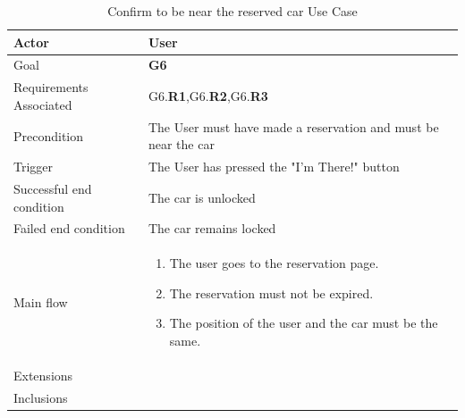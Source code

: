 \newline
\begin{table}[htb]
\begin{center}
\renewcommand{\arraystretch}{1.5}
\begin{tabular}{|l|p{}|}
\hline
Actor & User \\ \hline
Goal & \textbf{G6} \\ \hline
Requirements Associated & G6.\textbf{R1},G6.\textbf{R2},G6.\textbf{R3} \\ \hline
Precondition & The User must have made a reservation and must be near the car \\ \hline
Trigger & The User has pressed the "I'm There!" button \\ \hline
Successful end condition & The car is unlocked \\ \hline
Failed end condition & The car remains locked \\ \hline
Main flow & \begin{minipage}[t]{0.6\textwidth}
\begin{enumerate}
\addtolength{\itemindent}{0.5cm}
\item The user goes to the reservation page.
\item The reservation must not be expired.
\item The position of the user and the car must be the same. 
\vspace{2,5mm}
\end{enumerate}
\end{minipage} \\ \hline
Extensions & \\ \hline
Inclusions & \\ \hline
\end{tabular}
\caption{ Confirm to be near the reserved car Use Case}
\end{center}
\end{table}
\clearpage

